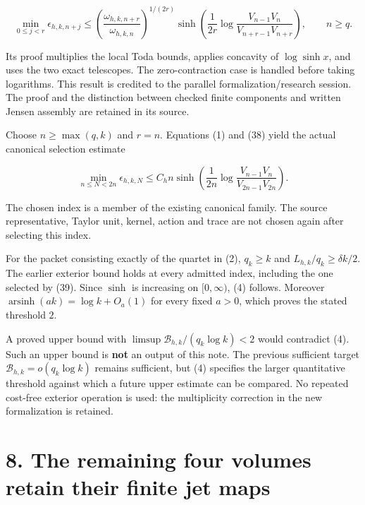 \[
 \min_{0\le j<r}\epsilon_{h,k,n+j}
 \le
 \left(\frac{\omega_{h,k,n+r}}{\omega_{h,k,n}}\right)^{1/(2r)}
 \sinh\!\left(\frac1{2r}
       \log\frac{V_{n-1}V_n}{V_{n+r-1}V_{n+r}}\right),\qquad n\ge q.
                                                                         \tag{38}
\]

Its proof multiplies the local Toda bounds, applies concavity of
\(\log\sinh x\), and uses the two exact telescopes. The zero-contraction
case is handled before taking logarithms. This result is credited to the
parallel formalization/research session. The proof and the distinction
between checked finite components and written Jensen assembly are
retained in its source.

Choose \(n\ge\max(q,k)\) and \(r=n\). Equations (1) and (38) yield the
actual canonical selection estimate

\[
 \boxed{
 \min_{n\le N<2n}\epsilon_{h,k,N}
 \le C_hn\sinh\!\left(\frac1{2n}
                 \log\frac{V_{n-1}V_n}{V_{2n-1}V_{2n}}\right).
 }                                                                     \tag{39}
\]

The chosen index is a member of the existing canonical family. The
source representative, Taylor unit, kernel, action and trace are not
chosen again after selecting this index.

For the packet consisting exactly of the quartet in (2), \(q_k\ge k\)
and \(L_{h,k}/q_k\ge\delta k/2\). The earlier exterior bound holds at
every admitted index, including the one selected by (39). Since
\(\sinh\) is increasing on \([0,\infty)\), (4) follows. Moreover
\(\operatorname{arsinh}(ak)=\log k+O_a(1)\) for every fixed \(a>0\),
which proves the stated threshold \(2\).

A proved upper bound with \(\limsup\mathcal B_{h,k}/(q_k\log k)<2\)
would contradict (4). Such an upper bound is \textbf{not} an output of
this note. The previous sufficient target
\(\mathcal B_{h,k}=o(q_k\log k)\) remains sufficient, but (4) specifies
the larger quantitative threshold against which a future upper estimate
can be compared. No repeated cost-free exterior operation is used: the
multiplicity correction in the new formalization is retained.

\section{8. The remaining four volumes retain their finite jet
maps}\label{GraphV2:the-remaining-four-volumes-retain-their-finite-jet-maps}

